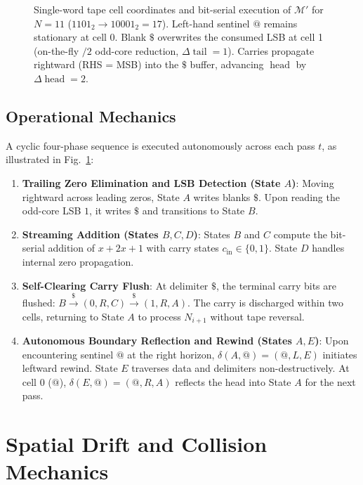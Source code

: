 \documentclass[journal,10pt,twocolumn]{IEEEtran}
\DeclareMathOperator{\tail}{tail}
\DeclareMathOperator{\head}{head}
\begin{document}
\begin{figure}[htbp]
\caption{Single-word tape cell coordinates and bit-serial execution of $\mathcal{M}'$ for $N=11$ ($1101_2 \to 10001_2 = 17$). Left-hand sentinel $@$ remains stationary at cell 0. Blank $\$$ overwrites the consumed LSB at cell 1 (on-the-fly $/2$ odd-core reduction, $\Delta\tail=1$). Carries propagate rightward (RHS = MSB) into the $\$$ buffer, advancing $\head$ by $\Delta\head=2$.}
\label{fig:tape_trace}
\end{figure}

\subsection{Operational Mechanics}
A cyclic four-phase sequence is executed autonomously across each pass $t$, as illustrated in Fig.~\ref{fig:tape_trace}:
\begin{enumerate}
    \item \textbf{Trailing Zero Elimination and LSB Detection (State $A$)}: Moving rightward across leading zeros, State $A$ writes blanks $\$$. Upon reading the odd-core LSB $1$, it writes $\$$ and transitions to State $B$.
    \item \textbf{Streaming Addition (States $B, C, D$)}: States $B$ and $C$ compute the bit-serial addition of $x + 2x + 1$ with carry states $c_{\text{in}} \in \{0, 1\}$. State $D$ handles internal zero propagation.
    \item \textbf{Self-Clearing Carry Flush}: At delimiter $\$$, the terminal carry bits are flushed: $B \xrightarrow{\$} (0, R, C) \xrightarrow{\$} (1, R, A)$. The carry is discharged within two cells, returning to State $A$ to process $N_{i+1}$ without tape reversal.
    \item \textbf{Autonomous Boundary Reflection and Rewind (States $A, E$)}: Upon encountering sentinel $@$ at the right horizon, $\delta(A, @) = (@, L, E)$ initiates leftward rewind. State $E$ traverses data and delimiters non-destructively. At cell 0 ($@$), $\delta(E, @) = (@, R, A)$ reflects the head into State $A$ for the next pass.
\end{enumerate}

\section{Spatial Drift and Collision Mechanics}
\end{document}
